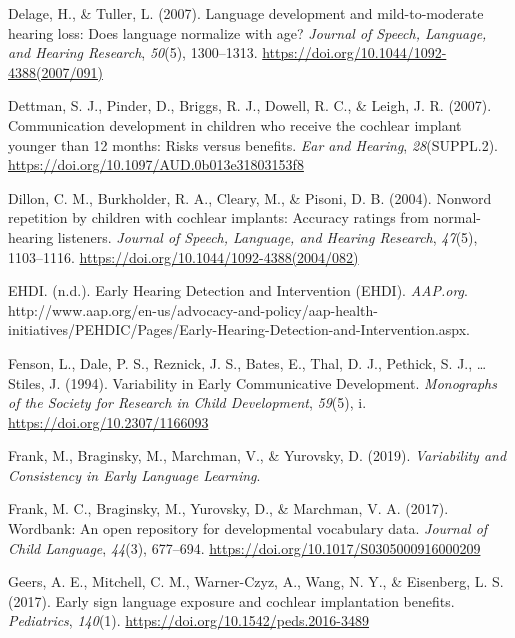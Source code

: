 \documentclass[english,man,floatsintext]{apa6}
\begin{document}
\leavevmode\hypertarget{ref-delage2007}{}%
Delage, H., \& Tuller, L. (2007). Language development and mild-to-moderate hearing loss: Does language normalize with age? \emph{Journal of Speech, Language, and Hearing Research}, \emph{50}(5), 1300--1313. \url{https://doi.org/10.1044/1092-4388(2007/091)}

\leavevmode\hypertarget{ref-dettman2007}{}%
Dettman, S. J., Pinder, D., Briggs, R. J., Dowell, R. C., \& Leigh, J. R. (2007). Communication development in children who receive the cochlear implant younger than 12 months: Risks versus benefits. \emph{Ear and Hearing}, \emph{28}(SUPPL.2). \url{https://doi.org/10.1097/AUD.0b013e31803153f8}

\leavevmode\hypertarget{ref-dillon2004}{}%
Dillon, C. M., Burkholder, R. A., Cleary, M., \& Pisoni, D. B. (2004). Nonword repetition by children with cochlear implants: Accuracy ratings from normal-hearing listeners. \emph{Journal of Speech, Language, and Hearing Research}, \emph{47}(5), 1103--1116. \url{https://doi.org/10.1044/1092-4388(2004/082)}

\leavevmode\hypertarget{ref-ehdi}{}%
EHDI. (n.d.). Early Hearing Detection and Intervention (EHDI). \emph{AAP.org}. http://www.aap.org/en-us/advocacy-and-policy/aap-health-initiatives/PEHDIC/Pages/Early-Hearing-Detection-and-Intervention.aspx.

\leavevmode\hypertarget{ref-fenson1994}{}%
Fenson, L., Dale, P. S., Reznick, J. S., Bates, E., Thal, D. J., Pethick, S. J., \ldots{} Stiles, J. (1994). Variability in Early Communicative Development. \emph{Monographs of the Society for Research in Child Development}, \emph{59}(5), i. \url{https://doi.org/10.2307/1166093}

\leavevmode\hypertarget{ref-frank2019}{}%
Frank, M., Braginsky, M., Marchman, V., \& Yurovsky, D. (2019). \emph{Variability and Consistency in Early Language Learning}.

\leavevmode\hypertarget{ref-frank2017}{}%
Frank, M. C., Braginsky, M., Yurovsky, D., \& Marchman, V. A. (2017). Wordbank: An open repository for developmental vocabulary data. \emph{Journal of Child Language}, \emph{44}(3), 677--694. \url{https://doi.org/10.1017/S0305000916000209}

\leavevmode\hypertarget{ref-geers2017}{}%
Geers, A. E., Mitchell, C. M., Warner-Czyz, A., Wang, N. Y., \& Eisenberg, L. S. (2017). Early sign language exposure and cochlear implantation benefits. \emph{Pediatrics}, \emph{140}(1). \url{https://doi.org/10.1542/peds.2016-3489}
\end{document}
